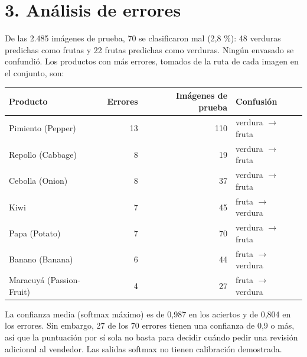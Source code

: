 \documentclass[11pt,a4paper]{article}
\begin{document}
\section*{3. Análisis de errores}
\noindent De las 2.485 imágenes de prueba, 70 se clasificaron mal (2,8 \%): 48 verduras predichas como frutas y 22 frutas predichas como verduras. Ningún envasado se confundió. Los productos con más errores, tomados de la ruta de cada imagen en el conjunto, son:\par
\begin{center}\small
\begin{tabularx}{\textwidth}{XrrX}
\toprule
\textbf{Producto} & \textbf{Errores} & \textbf{Imágenes de prueba} & \textbf{Confusión} \\
\midrule
Pimiento (Pepper) & 13 & 110 & verdura $\rightarrow$ fruta \\
Repollo (Cabbage) & 8 & 19 & verdura $\rightarrow$ fruta \\
Cebolla (Onion) & 8 & 37 & verdura $\rightarrow$ fruta \\
Kiwi & 7 & 45 & fruta $\rightarrow$ verdura \\
Papa (Potato) & 7 & 70 & verdura $\rightarrow$ fruta \\
Banano (Banana) & 6 & 44 & fruta $\rightarrow$ verdura \\
Maracuyá (Passion-Fruit) & 4 & 27 & fruta $\rightarrow$ verdura \\
\bottomrule
\end{tabularx}
\end{center}
\noindent La confianza media (softmax máximo) es de 0,987 en los aciertos y de 0,804 en los errores. Sin embargo, 27 de los 70 errores tienen una confianza de 0,9 o más, así que la puntuación por sí sola no basta para decidir cuándo pedir una revisión adicional al vendedor. Las salidas softmax no tienen calibración demostrada.\par
\end{document}
